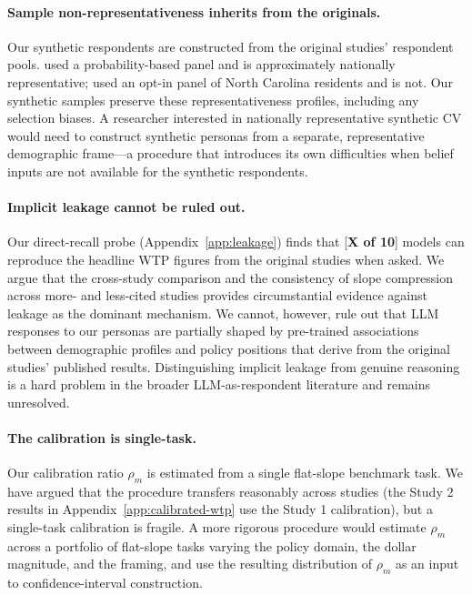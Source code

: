\documentclass[12pt]{article}
\begin{document}
\paragraph{Sample non-representativeness inherits from the originals.} Our synthetic respondents are constructed from the original studies' respondent pools. \textcite{Aldy2012} used a probability-based panel and is approximately nationally representative; \textcite{Giguere2020} used an opt-in panel of North Carolina residents and is not. Our synthetic samples preserve these representativeness profiles, including any selection biases. A researcher interested in nationally representative synthetic CV would need to construct synthetic personas from a separate, representative demographic frame---a procedure that introduces its own difficulties when belief inputs are not available for the synthetic respondents.

\paragraph{Implicit leakage cannot be ruled out.} Our direct-recall probe (Appendix~\ref{app:leakage}) finds that [\textbf{X of 10}] models can reproduce the headline WTP figures from the original studies when asked. We argue that the cross-study comparison and the consistency of slope compression across more- and less-cited studies provides circumstantial evidence against leakage as the dominant mechanism. We cannot, however, rule out that LLM responses to our personas are partially shaped by pre-trained associations between demographic profiles and policy positions that derive from the original studies' published results. Distinguishing implicit leakage from genuine reasoning is a hard problem in the broader LLM-as-respondent literature and remains unresolved.

\paragraph{The calibration is single-task.} Our calibration ratio $\rho_m$ is estimated from a single flat-slope benchmark task. We have argued that the procedure transfers reasonably across studies (the Study 2 results in Appendix~\ref{app:calibrated-wtp} use the Study 1 calibration), but a single-task calibration is fragile. A more rigorous procedure would estimate $\rho_m$ across a portfolio of flat-slope tasks varying the policy domain, the dollar magnitude, and the framing, and use the resulting distribution of $\rho_m$ as an input to confidence-interval construction.
\end{document}
